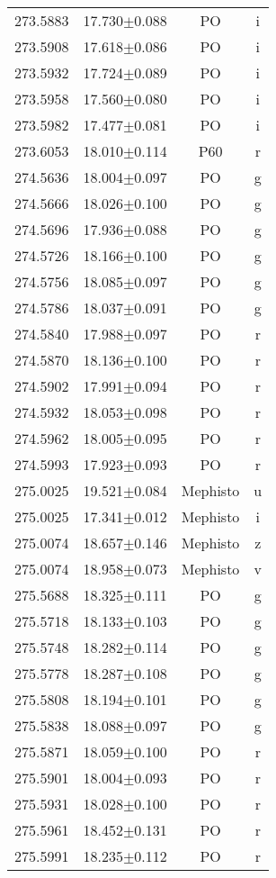 \begin{table}
\begin{tabular}{cccc}
273.5883 & 17.730$\pm$0.088 & PO & i \\
273.5908 & 17.618$\pm$0.086 & PO & i \\
273.5932 & 17.724$\pm$0.089 & PO & i \\
273.5958 & 17.560$\pm$0.080 & PO & i \\
273.5982 & 17.477$\pm$0.081 & PO & i \\
273.6053 & 18.010$\pm$0.114 & P60 & r \\
274.5636 & 18.004$\pm$0.097 & PO & g \\
274.5666 & 18.026$\pm$0.100 & PO & g \\
274.5696 & 17.936$\pm$0.088 & PO & g \\
274.5726 & 18.166$\pm$0.100 & PO & g \\
274.5756 & 18.085$\pm$0.097 & PO & g \\
274.5786 & 18.037$\pm$0.091 & PO & g \\
274.5840 & 17.988$\pm$0.097 & PO & r \\
274.5870 & 18.136$\pm$0.100 & PO & r \\
274.5902 & 17.991$\pm$0.094 & PO & r \\
274.5932 & 18.053$\pm$0.098 & PO & r \\
274.5962 & 18.005$\pm$0.095 & PO & r \\
274.5993 & 17.923$\pm$0.093 & PO & r \\
275.0025 & 19.521$\pm$0.084 & Mephisto & u \\
275.0025 & 17.341$\pm$0.012 & Mephisto & i \\
275.0074 & 18.657$\pm$0.146 & Mephisto & z \\
275.0074 & 18.958$\pm$0.073 & Mephisto & v \\
275.5688 & 18.325$\pm$0.111 & PO & g \\
275.5718 & 18.133$\pm$0.103 & PO & g \\
275.5748 & 18.282$\pm$0.114 & PO & g \\
275.5778 & 18.287$\pm$0.108 & PO & g \\
275.5808 & 18.194$\pm$0.101 & PO & g \\
275.5838 & 18.088$\pm$0.097 & PO & g \\
275.5871 & 18.059$\pm$0.100 & PO & r \\
275.5901 & 18.004$\pm$0.093 & PO & r \\
275.5931 & 18.028$\pm$0.100 & PO & r \\
275.5961 & 18.452$\pm$0.131 & PO & r \\
275.5991 & 18.235$\pm$0.112 & PO & r \\

\end{tabular}
\end{table}
